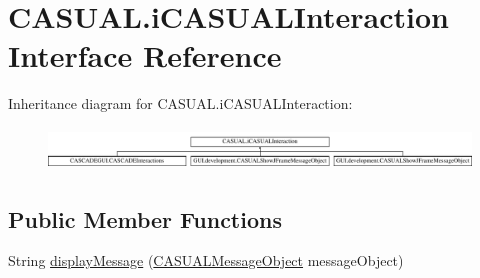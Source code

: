 \hypertarget{interfaceCASUAL_1_1iCASUALInteraction}{\section{C\-A\-S\-U\-A\-L.\-i\-C\-A\-S\-U\-A\-L\-Interaction Interface Reference}
\label{interfaceCASUAL_1_1iCASUALInteraction}
}
Inheritance diagram for C\-A\-S\-U\-A\-L.\-i\-C\-A\-S\-U\-A\-L\-Interaction\-:\begin{figure}[H]
\begin{center}
\leavevmode
\includegraphics[height=1.127895cm]{interfaceCASUAL_1_1iCASUALInteraction}
\end{center}
\end{figure}
\subsection*{Public Member Functions}
\begin{DoxyCompactItemize}
\item 
String \hyperlink{interfaceCASUAL_1_1iCASUALInteraction_a8c6697fd276aa8519caff45131c14bf4}{display\-Message} (\hyperlink{classCASUAL_1_1CASUALMessageObject}{C\-A\-S\-U\-A\-L\-Message\-Object} message\-Object)
\end{DoxyCompactItemize}
